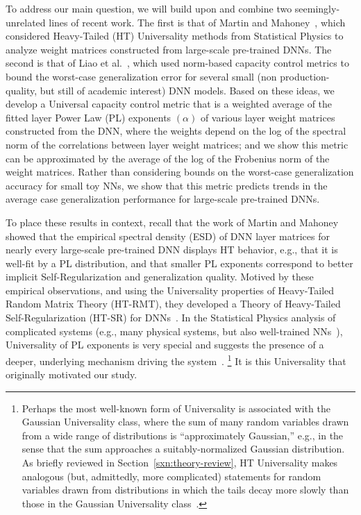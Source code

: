 To address our main question, we will build upon and combine two seemingly-unrelated lines of recent work.
The first is that of Martin and Mahoney~\cite{MM17_TR,MM18_TR}, which considered Heavy-Tailed (HT) Universality methods from Statistical Physics to analyze weight matrices constructed from large-scale pre-trained DNNs.
The second is that of Liao et al.~\cite{LMBx18_TR}, which used norm-based capacity control metrics to bound the worst-case generalization error for several small (non production-quality, but still of academic interest) DNN models.
Based on these ideas, we develop a Universal capacity control metric that is a weighted average of the fitted layer Power Law (PL) exponents 
$(\alpha)$ of various layer weight matrices constructed from the DNN, where the weights depend on the log of the spectral norm of the correlations between layer weight matrices; and we show this metric can be approximated by the average of the log of the Frobenius norm of the weight matrices.
Rather than considering bounds on the worst-case generalization accuracy for small toy NNs, we show that this metric predicts trends in the average case generalization performance for large-scale pre-trained DNNs.

To place these results in context, recall that the work of Martin and Mahoney~\cite{MM18_TR} showed that the empirical spectral density (ESD) of DNN layer matrices for nearly every large-scale pre-trained DNN displays HT behavior, e.g., that it is well-fit by a PL distribution, and that smaller PL exponents correspond to better implicit Self-Regularization and generalization quality.
Motived by these empirical observations, and using the Universality properties of Heavy-Tailed Random Matrix Theory (HT-RMT), they developed a Theory of Heavy-Tailed Self-Regularization (HT-SR) for DNNs~\cite{MM17_TR,MM18_TR}.
In the Statistical Physics analysis of complicated systems (e.g., many physical systems, but also well-trained NNs~\cite{EB01_BOOK,nishimori01}), Universality of PL exponents is very special and suggests the presence of a deeper, underlying mechanism driving the system~\cite{SornetteBook,BouchaudPotters03}.%
\footnote{Perhaps the most well-known form of Universality is associated with the Gaussian Universality class, where the sum of many random variables drawn from a wide range of distributions is ``approximately Gaussian,'' e.g., in the sense that the sum approaches a suitably-normalized Gaussian distribution.  As briefly reviewed in Section~\ref{sxn:theory-review}, HT Universality makes analogous (but, admittedly, more complicated) statements for random variables drawn from distributions in which the tails decay more slowly than those in the Gaussian Universality class~\cite{MM18_TR}.}
It is this Universality that originally motivated our study.

